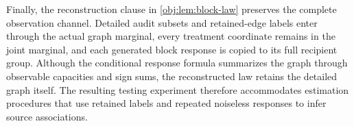 Finally, the reconstruction clause in \cref{obj:lem:block-law} preserves the complete observation channel. Detailed audit subsets and retained-edge labels enter through the actual graph marginal, every treatment coordinate remains in the joint marginal, and each generated block response is copied to its full recipient group. Although the conditional response formula summarizes the graph through observable capacities and sign sums, the reconstructed law retains the detailed graph itself. The resulting testing experiment therefore accommodates estimation procedures that use retained labels and repeated noiseless responses to infer source associations.
